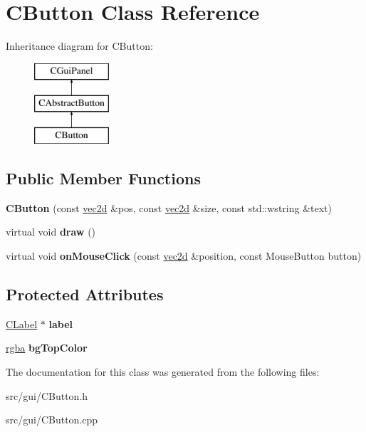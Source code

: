 \hypertarget{class_c_button}{
\section{CButton Class Reference}
\label{class_c_button}
}
Inheritance diagram for CButton:\begin{figure}[H]
\begin{center}
\leavevmode
\includegraphics[height=3.000000cm]{class_c_button}
\end{center}
\end{figure}
\subsection*{Public Member Functions}
\begin{DoxyCompactItemize}
\item 
\hypertarget{class_c_button_a817841919e8ed28c21edde93768ba56d}{
{\bfseries CButton} (const \hyperlink{classvec2d}{vec2d} \&pos, const \hyperlink{classvec2d}{vec2d} \&size, const std::wstring \&text)}
\label{class_c_button_a817841919e8ed28c21edde93768ba56d}

\item 
\hypertarget{class_c_button_abf2c2a6bb002631bbe2c6dde5d73925b}{
virtual void {\bfseries draw} ()}
\label{class_c_button_abf2c2a6bb002631bbe2c6dde5d73925b}

\item 
\hypertarget{class_c_button_a03b5374e6d90fea0d6ede8d6a0fbd1a3}{
virtual void {\bfseries onMouseClick} (const \hyperlink{classvec2d}{vec2d} \&position, const MouseButton button)}
\label{class_c_button_a03b5374e6d90fea0d6ede8d6a0fbd1a3}

\end{DoxyCompactItemize}
\subsection*{Protected Attributes}
\begin{DoxyCompactItemize}
\item 
\hypertarget{class_c_button_a7641ebdd3f3c68ae593cc12069f80a7c}{
\hyperlink{class_c_label}{CLabel} $\ast$ {\bfseries label}}
\label{class_c_button_a7641ebdd3f3c68ae593cc12069f80a7c}

\item 
\hypertarget{class_c_button_a8de5eb1d2eb624ec5138d63badc7a87f}{
\hyperlink{classrgba}{rgba} {\bfseries bgTopColor}}
\label{class_c_button_a8de5eb1d2eb624ec5138d63badc7a87f}

\end{DoxyCompactItemize}


The documentation for this class was generated from the following files:\begin{DoxyCompactItemize}
\item 
src/gui/CButton.h\item 
src/gui/CButton.cpp\end{DoxyCompactItemize}
